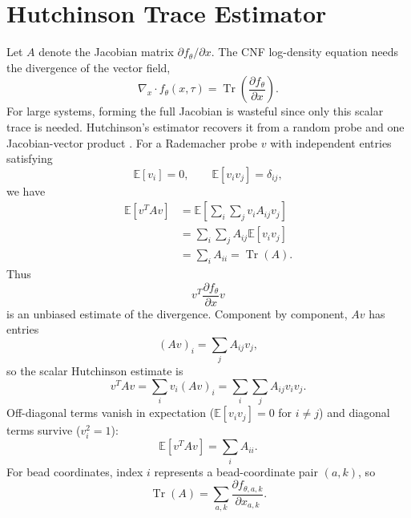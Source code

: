 \documentclass[reprint,amsmath,amssymb,aps,pra,10pt]{revtex4-2}
\begin{document}
\section{Hutchinson Trace Estimator}

Let $A$ denote the Jacobian matrix $\partial f_\theta/\partial x$.
The CNF log-density equation needs the divergence of the vector field,
\begin{equation}
    \nabla_x\cdot f_\theta(x,\tau)
    =
    \operatorname{Tr}
    \left(
        \frac{\partial f_\theta}{\partial x}
    \right).
\end{equation}
For large systems, forming the full Jacobian is wasteful since only this scalar trace is needed.
Hutchinson's estimator recovers it from a random probe and one Jacobian-vector product \cite{hutchinson1989,roostakhorasani2015}.
For a Rademacher probe $v$ with independent entries satisfying
\begin{equation}
    \mathbb{E}[v_i]=0,
    \qquad
    \mathbb{E}[v_i v_j]=\delta_{ij},
\end{equation}
we have
\begin{align}
    \mathbb{E}\left[v^T A v\right]
    &=
    \mathbb{E}
    \left[
        \sum_i\sum_j v_i A_{ij} v_j
    \right]
    \nonumber \\
    &=
    \sum_i\sum_j
    A_{ij}
    \mathbb{E}\left[v_i v_j\right]
    \nonumber \\
    &=
    \sum_i A_{ii}
    =
    \operatorname{Tr}(A).
\end{align}
Thus
\begin{equation}
    v^T
    \frac{\partial f_\theta}{\partial x}
    v
\end{equation}
is an unbiased estimate of the divergence.
Component by component, $Av$ has entries
\begin{equation}
    (Av)_i
    =
    \sum_j
    A_{ij}v_j,
\end{equation}
so the scalar Hutchinson estimate is
\begin{equation}
    v^TAv
    =
    \sum_i
    v_i(Av)_i
    =
    \sum_i\sum_j
    A_{ij}v_i v_j.
\end{equation}
Off-diagonal terms vanish in expectation ($\mathbb{E}[v_iv_j]=0$ for $i\neq j$) and diagonal terms survive ($v_i^2=1$):
\begin{equation}
    \mathbb{E}[v^TAv]
    =
    \sum_i
    A_{ii}.
\end{equation}
For bead coordinates, index $i$ represents a bead-coordinate pair $(a,k)$, so
\begin{equation}
    \operatorname{Tr}(A)
    =
    \sum_{a,k}
    \frac{\partial f_{\theta,a,k}}
         {\partial x_{a,k}}.
\end{equation}
\end{document}
